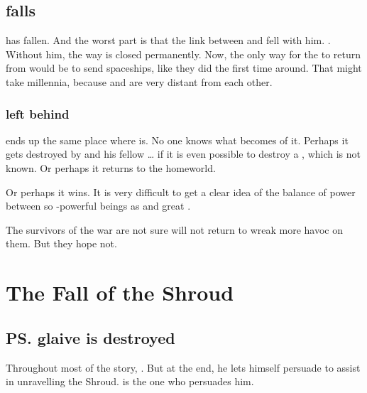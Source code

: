\subsection{\Daggerrain falls}
\Daggerrain{} has fallen. 
And the worst part is that the link between \Erebos{} and \Nyx{} fell with him. 
. Without him, the way is closed permanently. 
Now, the only way for the \banes{} to return from \Erebos{} would be to send spaceships, like they did the first time around. 
That might take millennia, because \Erebos{} and \Miith{} are very distant from each other. 





\subsubsection{\HothNrul{} left behind}
\HothNrul{} ends up the same place where \Daggerrain{} is. 
No one knows what becomes of it. 
Perhaps it gets destroyed by \Daggerrain{} and his fellow \banelords\ldots{} if it is even possible to destroy a \xs, which is not known. 
Or perhaps it returns to the \xs{} homeworld. 

Or perhaps it wins. 
It is very difficult to get a clear idea of the balance of power between so \uber-powerful beings as \xss{} and great \banelords. 

The survivors of the war are not sure \HothNrul{} will not return to wreak more havoc on them. 
But they hope not. 















\section{The Fall of the Shroud}
\subsection{\ps{\Ishnaruchaefir} glaive is destroyed}
Throughout most of the story, . But at the end, he lets himself persuade to assist in unravelling the Shroud. \Triestessakhin{} is the one who persuades him. 

